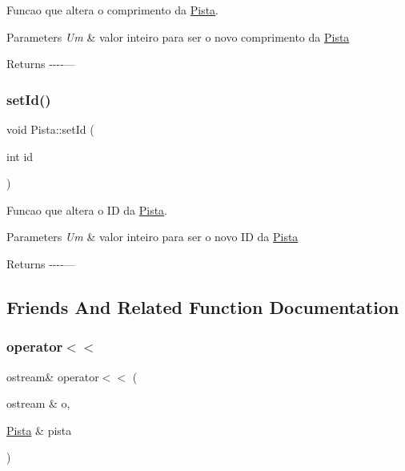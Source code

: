 Funcao que altera o comprimento da \hyperlink{classPista}{Pista}. 


\begin{DoxyParams}{Parameters}
{\em Um} & valor inteiro para ser o novo comprimento da \hyperlink{classPista}{Pista} \\
\hline
\end{DoxyParams}
\begin{DoxyReturn}{Returns}
-\/-\/-\/-\/--- 
\end{DoxyReturn}
\mbox{\label{classPista_a7700a1ada557bbb77de643848ebb4e08}} 
\subsubsection{\texorpdfstring{set\+Id()}{setId()}}
{\footnotesize\ttfamily void Pista\+::set\+Id (\begin{DoxyParamCaption}\item[{int}]{id }\end{DoxyParamCaption})}



Funcao que altera o ID da \hyperlink{classPista}{Pista}. 


\begin{DoxyParams}{Parameters}
{\em Um} & valor inteiro para ser o novo ID da \hyperlink{classPista}{Pista} \\
\hline
\end{DoxyParams}
\begin{DoxyReturn}{Returns}
-\/-\/-\/-\/--- 
\end{DoxyReturn}


\subsection{Friends And Related Function Documentation}
\mbox{\label{classPista_ab32f44295a5f3b212cd8830439cad5fc}} 
\subsubsection{\texorpdfstring{operator$<$$<$}{operator<<}}
{\footnotesize\ttfamily ostream\& operator$<$$<$ (\begin{DoxyParamCaption}\item[{ostream \&}]{o,  }\item[{\hyperlink{classPista}{Pista} \&}]{pista }\end{DoxyParamCaption})\hspace{0.3cm}{\ttfamily [friend]}}



